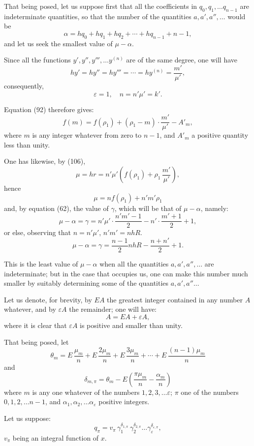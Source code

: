 \documentclass{article}
\begin{document}
That being posed, let us suppose first that all the coefficients in $q_0, q_1, \ldots q_{n-1}$ are indeterminate quantities, so that the number of the quantities $a, a', a'', \ldots$ would be
\[ \alpha = hq_0+hq_1+hq_2+\cdots+hq_{n-1}+n-1, \tag{135} \]
and let us seek the smallest value of $\mu-\alpha$.

Since all the functions $y', y'', y''', \ldots y^{(n)}$ are of the same degree, one will have
\[ hy' = hy'' = hy''' = \cdots = hy^{(n)} = \frac{m'}{\mu'}, \]
consequently,
\[ \varepsilon = 1, \quad n = n'\mu' = k'. \]

Equation (92) therefore gives:
\[ f(m) = f(\rho_1) + (\rho_1-m) \cdot \frac{m'}{\mu'} - A'_m, \tag{136} \]
where $m$ is any integer whatever from zero to $n-1$, and $A'_m$ a positive quantity less than unity.

One has likewise, by (106),
\[ \mu = hr = n'\mu'\left(f(\rho_1)+\rho_1\,\frac{m'}{\mu'}\right), \]
hence
\[ \mu = nf(\rho_1) + n'm'\rho_1 \tag{137} \]
and, by equation (62), the value of $\gamma$, which will be that of $\mu-\alpha$, namely:
\[ \mu-\alpha = \gamma = n'\mu' \cdot \frac{n'm'-1}{2} - n' \cdot \frac{m'+1}{2} + 1, \tag{138} \]
or else, observing that $n = n'\mu'$, $n'm' = nhR$.
\[ \mu-\alpha = \gamma = \frac{n-1}{2}nhR - \frac{n+n'}{2} + 1. \tag{139} \]

This is the least value of $\mu-\alpha$ when all the quantities $a, a', a'', \ldots$ are indeterminate; but in the case that occupies us, one can make this number much smaller by suitably determining some of the quantities $a, a', a'' \ldots$

Let us denote, for brevity, by $EA$ the greatest integer contained in any number $A$ whatever, and by $\varepsilon A$ the remainder; one will have:
\[ A = EA + \varepsilon A, \tag{140} \]
where it is clear that $\varepsilon A$ is positive and smaller than unity.

That being posed, let
\[ \theta_m = E\,\frac{\mu_m}{n} + E\,\frac{2\mu_m}{n} + E\,\frac{3\mu_m}{n} + \cdots + E\,\frac{(n-1)\mu_m}{n} \tag{141} \]
and
\[ \delta_{m,\pi} = \theta_m - E\left(\frac{\pi\mu_m}{n} - \frac{\alpha_m}{n}\right) \tag{142} \]
where $m$ is any one whatever of the numbers $1, 2, 3, \ldots \varepsilon$; $\pi$ one of the numbers $0, 1, 2, \ldots n-1$, and $\alpha_1, \alpha_2, \ldots \alpha_\varepsilon$ positive integers.

Let us suppose:
\[ q_\pi = v_\pi\,\gamma_1^{\delta_{1,\pi}}\,\gamma_2^{\delta_{2,\pi}} \ldots \gamma_\varepsilon^{\delta_{\varepsilon,\pi}}, \tag{143} \]
$v_\pi$ being an integral function of $x$.
\end{document}
